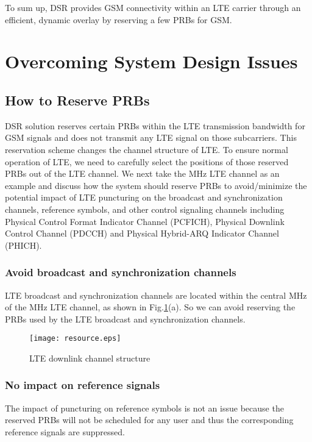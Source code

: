 \documentclass[10pt,journal]{IEEEtran}
\theoremstyle{slplain}
\begin{document}
To sum up, DSR provides GSM connectivity within an LTE carrier through an efficient, dynamic overlay by reserving a few PRBs for GSM.





\section{Overcoming System Design Issues}
\label{sec:overcome}



\subsection{How to Reserve PRBs}


DSR solution reserves certain PRBs within the LTE transmission bandwidth for GSM signals and does not transmit any LTE signal on those subcarriers. This reservation scheme changes the channel structure of LTE. To ensure normal operation of LTE, we need to carefully select the positions of those reserved PRBs out of the LTE channel. We next take the MHz LTE channel as an example and discuss how the system should reserve PRBs to avoid/minimize the potential impact of LTE puncturing on the broadcast and synchronization channels, reference symbols, and other control signaling channels including Physical Control Format Indicator Channel (PCFICH), Physical Downlink Control Channel (PDCCH) and Physical Hybrid-ARQ Indicator Channel (PHICH).

\subsubsection{Avoid broadcast and synchronization channels}
LTE broadcast and synchronization channels are located within the central MHz of the MHz LTE channel, as shown in Fig.\ref{fig:resource}(a). So we can avoid reserving the PRBs used by the LTE broadcast and synchronization channels.

 \begin{figure}
 \centering
 \texttt{[image: resource.eps]}
 \caption{LTE downlink channel structure}
 \label{fig:resource}
 \end{figure}


 \subsubsection{No impact on reference signals}
 The impact of puncturing on reference symbols is not an issue because the reserved PRBs will not be scheduled for any user and thus the corresponding reference signals are suppressed.
\end{document}
